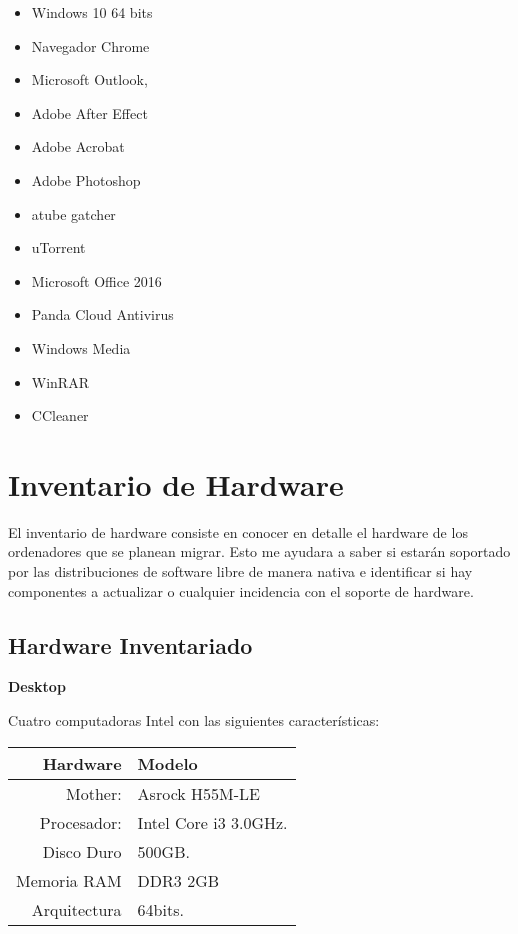			\begin{itemize}
				
				\item Windows 10 64 bits
				\item Navegador Chrome
				\item Microsoft Outlook,
				\item Adobe After Effect
				\item Adobe Acrobat
				\item Adobe Photoshop
				\item atube gatcher
				\item uTorrent
				\item Microsoft Office 2016
				\item Panda Cloud Antivirus
				\item Windows Media
				\item WinRAR
				\item CCleaner
			
			\end{itemize}
		
			\vspace{0.3cm}
		
	\section{Inventario de Hardware}
			
		El inventario de hardware consiste en conocer en detalle el hardware de los ordenadores que se planean migrar. Esto me ayudara a saber si estarán soportado por las distribuciones de software libre de manera nativa e identificar si hay componentes a actualizar o cualquier incidencia con el soporte de hardware.\par\vspace{0.3cm}
		
		\subsection{Hardware Inventariado}
		
			\textbf{Desktop}
							
			Cuatro computadoras Intel con las siguientes características:\par\vspace{0.2cm}
				
			\begin{center}
				\begin{tabular}{| r | l |}
					\hline
					Hardware & Modelo \\ \hline
					Mother: & Asrock H55M-LE \\ 
					Procesador: & Intel Core i3 3.0GHz. \\
					Disco Duro & 500GB. \\
					Memoria RAM & DDR3 2GB \\
					Arquitectura & 64bits.\\ \hline
				\end{tabular}
			\end{center}
		
